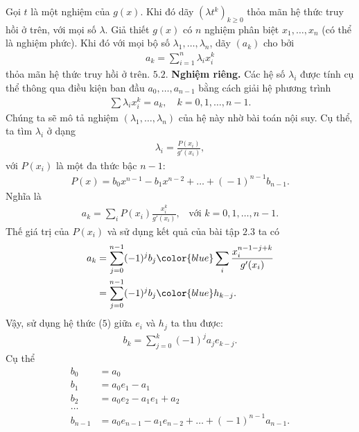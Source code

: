 \begin{multicols}{2}
	\vskip 0.1cm	
	Gọi $t$ là một nghiệm của $g(x)$. Khi đó dãy $(\lambda t^k)_{k\geq 0}$
	thỏa mãn hệ thức truy hồi  ở trên, với mọi số $\lambda$.
	\vskip 0.1cm	
	Giả thiết $g(x)$ có $n$ {\color{blue} nghiệm phân biệt} $x_1,\ldots,x_n$ (có thể là nghiệm phức). Khi đó với mọi bộ số $\lambda_1,\ldots, \lambda_n$, dãy $(a_k)$ cho bởi
	\begin{align*}
		a_k=\sum_{i=1}^n \lambda_i x_i^k
	\end{align*}
	thỏa mãn hệ thức truy hồi ở trên.
	\vskip 0.1cm	
	$\pmb{5.2.}$ \textbf{\color{hoccungpi}Nghiệm riêng.}
	Các hệ số $\lambda_i$ được tính cụ thể thông qua điều kiện ban đầu $a_0,\ldots,a_{n-1}$ bằng cách giải hệ phương trình
	\begin{align*}
		\label{ini-cond}\sum \lambda_i x_i^k=a_k,\quad k=0,1,\ldots,n-1. \tag{$10$}
	\end{align*}
	Chúng ta sẽ mô tả nghiệm $(\lambda_1,\ldots,\lambda_n)$ của hệ này nhờ bài toán nội suy. 
	Cụ thể, ta tìm $\lambda_i$ ở dạng
	\begin{align*}
		\lambda_i=\frac{P(x_i)}{g'(x_i)},
	\end{align*}
	với $P(x_i)$ là một đa thức bậc $n-1$:
	\begin{align*}
		P(x)\!=\!b_0x^{n\!-\!1}\!-\!b_1x^{n\!-\!2}\!+\!\ldots\!+\!(\!-\!1)^{n\!-\!1}b_{n\!-\!1}.
	\end{align*}
	Nghĩa là
	\begin{align*}
		a_k\!=\!\sum_iP(x_i)\frac{x_i^k}{g'(x_i)},\,\,\, \text{ với } k=0,1,\ldots,n\!-\!1.
	\end{align*}
	Thế giá trị của $P(x_i)$ và sử dụng kết quả của bài tập $2.3$ ta có
	\begin{align*}
		a_k&=\sum_{j=0}^{n-1}(-1)^jb_j
		{\color{blue}\sum_i
			\frac{x_i^{n-1-j+k}}{g'(x_i)}}\\
		&=\sum_{j=0}^{n-1}(-1)^jb_j{\color{blue} h_{k-j}}.
	\end{align*}
	Vậy, sử dụng hệ thức ($5$) giữa $e_i$ và $h_j$ ta thu được: 
	\begin{align*}
		b_k=\sum_{j=0}^k(-1)^ja_je_{k-j}. \tag{$11$}
	\end{align*}
	Cụ thể
	\begin{align*}
		b_0&=a_0\\
		b_1&=a_0e_1-a_1\\
		b_2&=a_0e_2-a_1e_1+a_2\\
		\dots&\\
		b_{n\!-\!1}&=a_0e_{n\!-\!1}\!-\!a_1e_{n\!-\!2}\!+\!\ldots\!+\!(\!-\!1)^{n\!-\!1}a_{n\!-\!1}.
	\end{align*}

\end{multicols}
